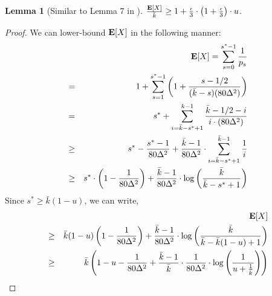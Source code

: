 \documentclass[11pt]{article}
\newtheorem{lemma}[theorem]{Lemma}
\newcommand{\ex}{{\bf E}}
\newcommand{\eps}{{\epsilon}}
\begin{document}
\begin{lemma}[Similar to Lemma 7 in \cite{br12}]
$\frac{\ex[X]}{\bar{k}} \geq 1 + \frac{\eps}{3} \cdot \left( 1 + \frac{\eps}{3}\right)\cdot u$.
\end{lemma}
\begin{proof}
We can lower-bound $\ex[X]$ in the following manner:
\begin{eqnarray*}
&&\ex[X]=\sum_{s=0}^{s^*-1} \frac{1}{p_s}\\
&=& 1 + \sum_{s=1}^{s^*-1} \left( 1 + \frac{s-1/2}{(\bar{k}-s) (80 \Delta^2)}\right) \\
&=& s^* + \sum_{i=\bar{k}-s^*+1}^{k-1} \frac{\bar{k}-1/2-i}{i \cdot (80 \Delta^2)} \\
&\geq& s^* - \frac{s^*-1}{80 \Delta^2} + \frac{\bar{k}-1}{80 \Delta^2} \cdot \sum_{i=\bar{k}-s^*+1}^{\bar{k}-1} \frac{1}{i} \\
&\geq& s^* \cdot \left(1 - \frac{1}{80 \Delta^2}\right) + \frac{\bar{k}-1}{80 \Delta^2} \cdot \log \left( \frac{\bar{k}}{\bar{k}-s^*+1}\right) \\
\end{eqnarray*}
Since $s^* \geq \bar{k}(1-u)$, we can write,
\begin{eqnarray*}
&&\ex[X]\\
&\geq& \bar{k} (1-u) \left(1 - \frac{1}{80 \Delta^2}\right) + \frac{\bar{k}-1}{80 \Delta^2} \cdot \log \left( \frac{\bar{k}}{\bar{k}-\bar{k}(1-u)+1}\right)\\
&\geq& \bar{k} \left(1 - u - \frac{1}{80 \Delta^2} + \frac{\bar{k}-1}{\bar{k}} \cdot \frac{1}{80 \Delta^2} \cdot \log \left( \frac{1}{u + \frac{1}{\bar{k}}}\right)\right)
\end{eqnarray*}


\end{proof}
\end{document}
